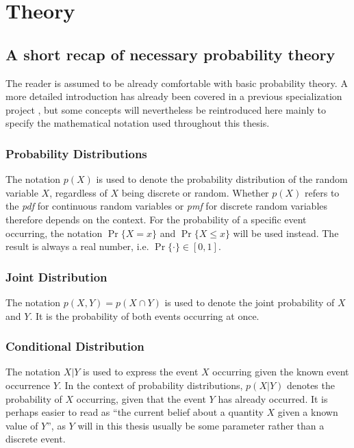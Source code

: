 \chapter{Theory}\label{chap:theory}

\section{A short recap of necessary probability theory}
The reader is assumed to be already comfortable with basic probability theory. A more detailed introduction has already been covered in a previous specialization project \cite{mellbye}, but some concepts will nevertheless be reintroduced here mainly to specify the mathematical notation used throughout this thesis. 

\subsection{Probability Distributions}
The notation $p(X)$ is used to denote the probability distribution of the random variable $X$, regardless of $X$ being discrete or random. Whether $p(X)$ refers to the \textit{\acrfull{pdf}} for continuous random variables or \textit{\acrfull{pmf}} for discrete random variables therefore depends on the context. For the probability of a specific event occurring, the notation $\Pr\{X=x\}$ and $\Pr\{X \leq x\}$ will be used instead. The result is always a real number, i.e. $\Pr\{\cdot\} \in [0, 1]$. 

\subsection{Joint Distribution}
The notation $p(X, Y) = p(X \cap Y)$ is used to denote the joint probability of $X$ and $Y$. It is the probability of both events occurring at once.

\subsection{Conditional Distribution}
The notation $X | Y$ is used to express the event $X$ occurring given the known event occurrence $Y$. In the context of probability distributions, $p(X | Y)$ denotes the probability of $X$ occurring, given that the event $Y$ has already occurred. It is perhaps easier to read as ``the current belief about a quantity $X$ given a known value of $Y$'', as $Y$ will in this thesis usually be some parameter rather than a discrete event. 

